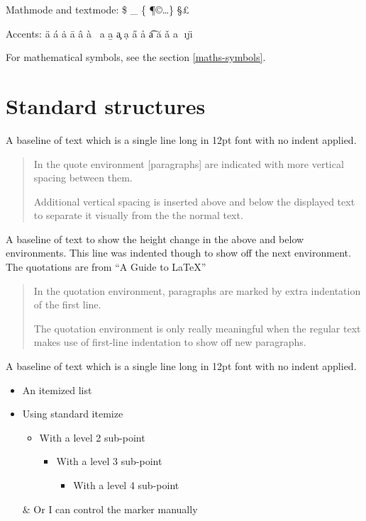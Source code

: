 \documentclass[12pt,a4paper]{article}
\begin{document}
\noindent
Mathmode and textmode: \$  \_  \ddag  \{  \P  \copyright  \dots  \}  \S  \dag  \pounds

\noindent
Accents: \"{a}  \'{a}  \.{a}  \={a}  \^{a}  \`{a}  \  {a}  \b{a}  \c{a}  \d{a}  \H{a}  \r{a}  \t{a}  \u{a}  \v{a}  \textcircled{a}  \i  \j  \"{\i}

\bigskip

For mathematical symbols, see the section \ref{maths-symbols}. 

\newpage

\section{Standard structures}

\noindent
A baseline of text which is a single line long in 12pt font with no indent applied.

\begin{quote}
In the quote environment [paragraphs] are indicated with more vertical spacing between them. 

Additional vertical spacing is inserted above and below the displayed text to separate it visually from the the normal text.
\end{quote}

A baseline of text to show the height change in the above and below environments. This line was indented though to show off the next environment. The quotations are from ``A Guide to \LaTeX'' \cite{KopkaDaly}

\begin{quotation}
In the quotation environment, paragraphs are marked by extra indentation of the first line. 

The quotation environment is only really meaningful when the regular text makes use of first-line indentation to show off new paragraphs.
\end{quotation}


\noindent
A baseline of text which is a single line long in 12pt font with no indent applied.

\begin{itemize}
\item An itemized list
\item Using standard itemize
\begin{itemize}
\item With a level 2 sub-point
\begin{itemize}
\item With a level 3 sub-point
\begin{itemize}
\item With a level 4 sub-point
\end{itemize}
\end{itemize}
\end{itemize}
\item[\&] Or I can control the marker manually
\end{itemize}
\end{document}
